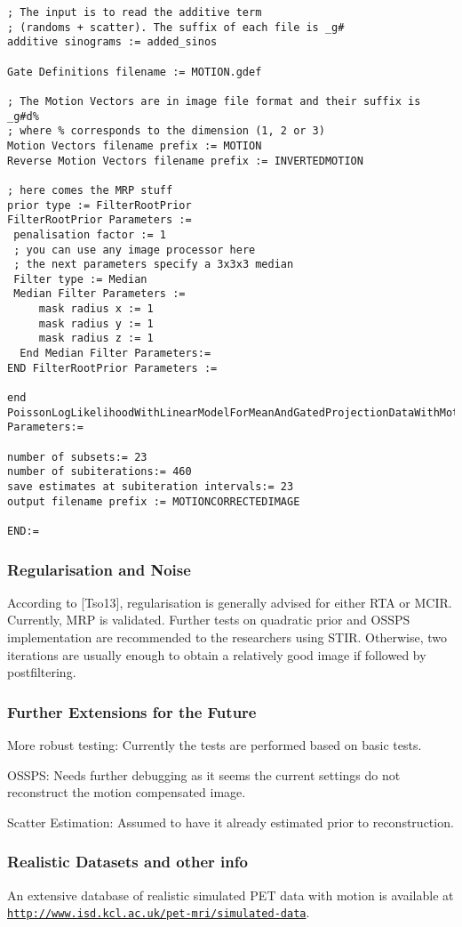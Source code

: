 \documentclass{article}
\def\url#1#2{\mbox{\href{#1}{\tt #2}}}
\begin{document}
{{\begin{verbatim}
; The input is to read the additive term 
; (randoms + scatter). The suffix of each file is _g#
additive sinograms := added_sinos

Gate Definitions filename := MOTION.gdef

; The Motion Vectors are in image file format and their suffix is _g#d% 
; where % corresponds to the dimension (1, 2 or 3) 
Motion Vectors filename prefix := MOTION
Reverse Motion Vectors filename prefix := INVERTEDMOTION

; here comes the MRP stuff
prior type := FilterRootPrior
FilterRootPrior Parameters :=
 penalisation factor := 1
 ; you can use any image processor here
 ; the next parameters specify a 3x3x3 median
 Filter type := Median
 Median Filter Parameters :=
     mask radius x := 1
     mask radius y := 1
     mask radius z := 1
  End Median Filter Parameters:=
END FilterRootPrior Parameters :=

end PoissonLogLikelihoodWithLinearModelForMeanAndGatedProjectionDataWithMotion Parameters:=

number of subsets:= 23
number of subiterations:= 460
save estimates at subiteration intervals:= 23 
output filename prefix := MOTIONCORRECTEDIMAGE

END:=
\end{verbatim}
}

\subsubsection{Regularisation and Noise}
According to [Tso13], regularisation is generally advised for either RTA or MCIR.
Currently, MRP is validated. Further tests on quadratic prior and OSSPS
implementation are recommended to the researchers using STIR. Otherwise, two
iterations are usually enough to obtain a relatively good image if followed by
postfiltering. 


\subsubsection{Further Extensions for the Future}
More robust testing: Currently the tests are performed based on basic tests.

OSSPS: Needs further debugging as it seems the current settings do not reconstruct the
motion compensated image. 

Scatter Estimation: Assumed to have it already estimated prior to reconstruction. 

\subsubsection{Realistic Datasets and other info}
An extensive
database of realistic simulated PET data with motion is available at\\
\url{http://www.isd.kcl.ac.uk/pet-mri/simulated-data/}{http://www.isd.kcl.ac.uk/pet-mri/simulated-data}. 

}
\end{document}
